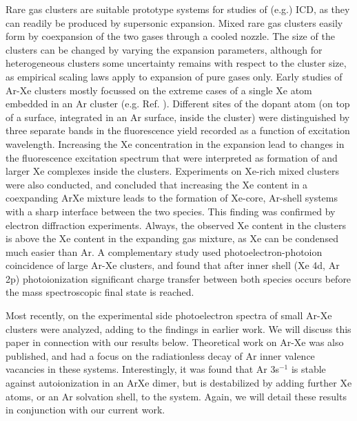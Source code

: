 Rare gas clusters are suitable prototype systems for studies of
(e.g.) ICD, as they can readily be produced by supersonic 
expansion. Mixed rare gas clusters easily form by coexpansion of 
the two gases through a cooled nozzle. The size of the clusters 
can be changed by varying the expansion parameters, although for 
heterogeneous clusters some uncertainty remains with respect to 
the cluster size, as empirical scaling laws \cite{hagena1981} 
apply to expansion of pure gases only. Early studies of Ar-Xe 
clusters mostly focussed on the extreme cases of a single Xe atom 
embedded in an Ar cluster (e.g. Ref. ). 
Different sites of the dopant atom (on top of a surface, 
integrated in an Ar surface, inside the cluster) were 
distinguished by three separate bands in the fluorescence yield 
recorded as a function of excitation wavelength.\cite{lengenprl} 
Increasing the Xe concentration in the expansion lead to changes 
in the fluorescence excitation spectrum that were interpreted as 
formation of  and larger Xe complexes inside the clusters.
\cite{lengen} Experiments on Xe-rich mixed clusters were also 
conducted, and concluded that increasing the Xe content in a 
coexpanding ArXe mixture leads to the formation of Xe-core, 
Ar-shell systems with a sharp interface between the two species.\cite
{tchaplyguine,hoener} This finding was confirmed by electron 
diffraction experiments.\cite{Danylchenko} Always, the observed 
Xe content in the clusters is above the Xe content in the 
expanding gas mixture, as Xe can be condensed much easier than Ar.
A complementary study used photoelectron-photoion coincidence of
large Ar-Xe clusters, and found that after inner shell (Xe 4d, Ar 2p)
photoionization significant charge transfer between both species
occurs before the mass spectroscopic final state is reached.\cite{berrah}

Most recently, on the experimental side photoelectron spectra of 
small Ar-Xe clusters were analyzed, adding to the findings in 
earlier work.\cite{Lindblad} We will discuss this paper in 
connection with our results below. Theoretical work on Ar-Xe was 
also published, and had a focus on the radiationless decay of Ar 
inner valence vacancies in these systems.\cite{fasshauer,Fasshauer13}
Interestingly, it was found that Ar 3s$^{-1}$ is stable 
against autoionization in an ArXe dimer, but is destabilized by 
adding further Xe atoms, or an Ar solvation shell, to the system. 
Again, we will detail these results in conjunction with our 
current work.

